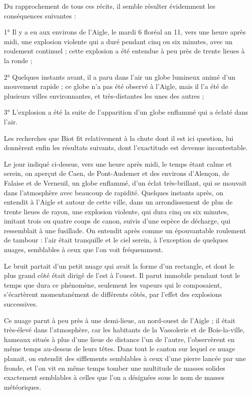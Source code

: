 \documentclass[a4paper, 12pt, oneside, french]{article}
\begin{document}
Du rapprochement de tous ces récits, il semble résulter évidemment les conséquences suivantes :

1° Il y a eu aux environs de l'Aigle, le mardi 6 floréal an 11, vers une heure après midi, une explosion violente qui a duré pendant cinq ou six minutes, avec un roulement continuel ; cette explosion a été entendue à peu près de trente lieues à la ronde ;

2° Quelques instants avant, il a paru dans l'air un globe lumineux animé d'un mouvement rapide ; ce globe n'a pas été observé à l'Aigle, mais il l'a été de plusieurs villes environnantes, et très-distantes les unes des autres ;

3° L'explosion a été la suite de l'apparition d'un globe enflammé qui a éclaté dans l'air.

Les recherches que Biot fit relativement à la chute dont il est ici question, lui donnèrent enfin les résultats suivants, dont l'exactitude est devenue incontestable.

Le jour indiqué ci-dessus, vers une heure après midi, le temps étant calme et serein, on aperçut de Caen, de Pont-Audemer et des environs d'Alençon, de Falaise et de Verneuil, un globe enflammé, d'un éclat très-brillant, qui se mouvait dans l'atmosphère avec beaucoup de rapidité. Quelques instants après, on entendit à l'Aigle et autour de cette ville, dans un arrondissement de plus de trente lieues de rayon, une explosion violente, qui dura cinq ou six minutes, imitant trois ou quatre coups de canon, suivis d'une espèce de décharge, qui ressemblait à une fusillade. On entendit après comme un épouvantable roulement de tambour : l'air était tranquille et le ciel serein, à l'exception de quelques nuages, semblables à ceux que l'on voit fréquemment.

Le bruit partait d'un petit nuage qui avait la forme d'un rectangle, et dont le plus grand côté était dirigé de l'est à l'ouest. Il parut immobile pendant tout le temps que dura ce phénomène, seulement les vapeurs qui le composaient, s'écartèrent momentanément de différents côtés, par l'effet des explosions successives.

Ce nuage parut à peu près à une demi-lieue, au nord-ouest de l'Aigle ; il était très-élevé dans l'atmosphère, car les habitants de la Vassolerie et de Bois-la-ville, hameaux situés à plus d'une lieue de distance l'un de l'autre, l'observèrent en même temps au-dessus de leurs têtes. Dans tout le canton sur lequel ce nuage planait, on entendit des sifflements semblables à ceux d'une pierre lancée par une fronde, et l'on vit en même temps tomber une multitude de masses solides exactement semblables à celles que l'on a désignées sous le nom de masses météoriques.
\end{document}
